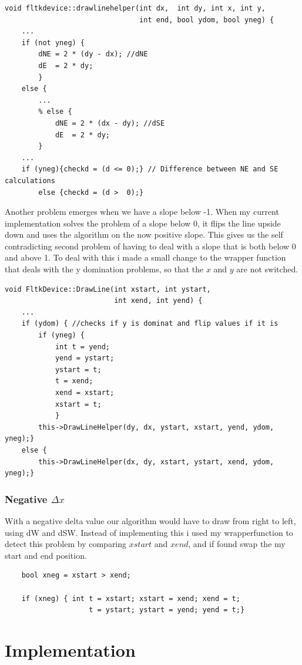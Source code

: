 \documentclass{article}
\begin{document}
\begin{verbatim}
void fltkdevice::drawlinehelper(int dx,  int dy, int x, int y, 
                                int end, bool ydom, bool yneg) {
    ...
    if (not yneg) {
        dNE = 2 * (dy - dx); //dNE
        dE  = 2 * dy;
        }
    else {
        ...
        % else {
            dNE = 2 * (dx - dy); //dSE
            dE  = 2 * dy;
        }
    ...
    if (yneg){checkd = (d <= 0);} // Difference between NE and SE calculations
        else {checkd = (d >  0);}
\end{verbatim}
Another problem emerges when we have a slope below -1. When my 
current implementation solves the problem of a slope below 0,
it flips the line upside down and uses the algorithm on the now
positive slope. This gives us the self contradicting second 
problem of having to deal with a slope that is both below 0 
and above 1. To deal with this i made a small change to the
wrapper function that deals with the y domination problems,
so that the $x$ and $y$ are not switched. 
\begin{verbatim}
void FltkDevice::DrawLine(int xstart, int ystart, 
                          int xend, int yend) {
    ...
    if (ydom) { //checks if y is dominat and flip values if it is
        if (yneg) {
            int t = yend;
            yend = ystart;
            ystart = t;
            t = xend;
            xend = xstart;
            xstart = t;
            }
        this->DrawLineHelper(dy, dx, ystart, xstart, yend, ydom, yneg);}
    else {
        this->DrawLineHelper(dx, dy, xstart, ystart, xend, ydom, yneg);}
\end{verbatim}

\subsubsection{Negative $\Delta x$}
With a negative delta value our algorithm would have to draw from
right to left, using dW and dSW. Instead of implementing this
i used my wrapperfunction to detect this problem by comparing
$xstart$ and $xend$, and if found swap the my start and end position.
\begin{verbatim}
    bool xneg = xstart > xend;

    if (xneg) { int t = xstart; xstart = xend; xend = t;
                    t = ystart; ystart = yend; yend = t;}
\end{verbatim}

\section{Implementation}
\end{document}
